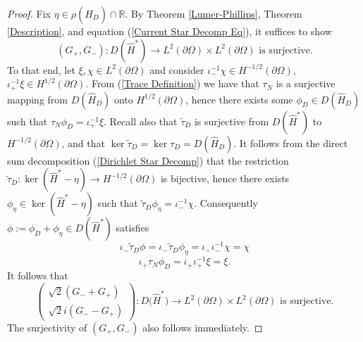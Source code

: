 \documentclass{article}
\numberwithin{equation}{section}
\begin{document}
\begin{proof}
    Fix $\eta \in \rho(\hat{H}_D)\cap \mathbb{R}$. By Theorem \ref{Lumer-Phillips}, Theorem \ref{Description}, and equation (\ref{Current Star Decomp Eq}), it suffices to show
    \begin{equation}
        (G_+, G_-):D(\hat{H}^*)\to L^2(\partial \Omega)\times L^2(\partial \Omega)\text{ is surjective.}
    \end{equation}
    To that end, let $\xi, \chi \in L^2(\partial \Omega)$ and consider $\iota_-^{-1}\chi \in H^{-1/2}(\partial \Omega)$, $\iota_+^{-1}\xi \in H^{1/2}(\partial \Omega)$. From (\ref{Trace Definition}) we have that $\tau_N$ is a surjective mapping from $D(\hat{H}_D)$ onto $H^{1/2}(\partial \Omega)$, hence there exists some $\phi_D \in D(\hat{H}_D)$ such that $\tau_N \phi_D=\iota_+^{-1}\xi$. Recall also that $\tilde{\tau}_D$ is surjective from $D(\hat{H}^*)$ to $H^{-1/2}(\partial \Omega)$, and that $\ker \tilde{\tau}_D=\ker \tau_D= D(\hat{H}_D)$. It follows from the direct sum decomposition (\ref{Dirichlet Star Decomp}) that the restriction $\tilde{\tau}_D: \ker(\hat{H}^*-\eta)\to H^{-1/2}(\partial \Omega)$ is bijective, hence there exists $\phi_\eta \in \ker(\hat{H}^*-\eta)$ such that $\tilde{\tau}_D \phi_\eta=\iota_-^{-1}\chi$. Consequently $\phi:=\phi_D + \phi_\eta \in D(\hat{H}^*)$ satisfies 
    \begin{equation}
        \iota_-\tilde{\tau}_D\phi=\iota_- \tilde{\tau}_D \phi_\eta=\iota_- \iota_-^{-1}\chi=\chi
    \end{equation}
    \begin{equation}
        \iota_+ \tau_N \phi_D=\iota_+ \iota_+^{-1}\xi=\xi. 
    \end{equation}
    It follows that 
    \begin{equation}
        \begin{pmatrix}
            \sqrt{2}(G_- + G_+)
            \\
            \sqrt{2}i (G_- - G_+)
        \end{pmatrix} :{D(\hat{H}^*}) \to L^2(\partial \Omega)\times L^2(\partial \Omega) \text{ is surjective}.
    \end{equation}
    The surjectivity of $(G_+, G_-)$ also follows immediately.
\end{proof}
\end{document}
